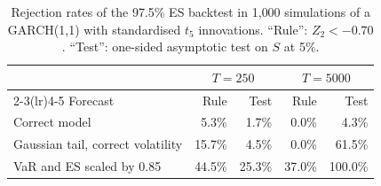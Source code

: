 \begin{table}[t]
\centering
\caption{Rejection rates of the 97.5\% ES backtest in 1{,}000 simulations of a GARCH(1,1) with standardised $t_5$ innovations. ``Rule'': $Z_2<-0.70$. ``Test'': one-sided asymptotic test on $S$ at 5\%.}
\label{tab:z2mc}
\small
\begin{tabular}{lrrrr}
\toprule
 & \multicolumn{2}{c}{$T=250$} & \multicolumn{2}{c}{$T=5000$} \\ \cmidrule(lr){2-3}\cmidrule(lr){4-5}
Forecast & Rule & Test & Rule & Test \\
\midrule
Correct model & 5.3\% & 1.7\% & 0.0\% & 4.3\% \\
Gaussian tail, correct volatility & 15.7\% & 4.5\% & 0.0\% & 61.5\% \\
VaR and ES scaled by 0.85 & 44.5\% & 25.3\% & 37.0\% & 100.0\% \\
\bottomrule
\end{tabular}
\end{table}
